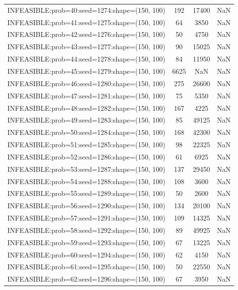 \begin{longtable}{lccc}
INFEASIBLE:prob=40:seed=1274:shape=(150, 100)  &   192 & 17400 &    NaN \\
INFEASIBLE:prob=41:seed=1275:shape=(150, 100)  &    64 &  3850 &    NaN \\
INFEASIBLE:prob=42:seed=1276:shape=(150, 100)  &    50 &  4750 &    NaN \\
INFEASIBLE:prob=43:seed=1277:shape=(150, 100)  &    90 & 15025 &    NaN \\
INFEASIBLE:prob=44:seed=1278:shape=(150, 100)  &    84 & 11950 &    NaN \\
INFEASIBLE:prob=45:seed=1279:shape=(150, 100)  &  6625 &   NaN &    NaN \\
INFEASIBLE:prob=46:seed=1280:shape=(150, 100)  &   275 & 26600 &    NaN \\
INFEASIBLE:prob=47:seed=1281:shape=(150, 100)  &    75 &  5350 &    NaN \\
INFEASIBLE:prob=48:seed=1282:shape=(150, 100)  &   167 &  4225 &    NaN \\
INFEASIBLE:prob=49:seed=1283:shape=(150, 100)  &    85 & 49125 &    NaN \\
INFEASIBLE:prob=50:seed=1284:shape=(150, 100)  &   168 & 42300 &    NaN \\
INFEASIBLE:prob=51:seed=1285:shape=(150, 100)  &    98 & 22325 &    NaN \\
INFEASIBLE:prob=52:seed=1286:shape=(150, 100)  &    61 &  6925 &    NaN \\
INFEASIBLE:prob=53:seed=1287:shape=(150, 100)  &   137 & 29450 &    NaN \\
INFEASIBLE:prob=54:seed=1288:shape=(150, 100)  &   108 &  3600 &    NaN \\
INFEASIBLE:prob=55:seed=1289:shape=(150, 100)  &    50 &  2600 &    NaN \\
INFEASIBLE:prob=56:seed=1290:shape=(150, 100)  &   134 & 20100 &    NaN \\
INFEASIBLE:prob=57:seed=1291:shape=(150, 100)  &   109 & 14325 &    NaN \\
INFEASIBLE:prob=58:seed=1292:shape=(150, 100)  &    89 & 49925 &    NaN \\
INFEASIBLE:prob=59:seed=1293:shape=(150, 100)  &    67 & 13225 &    NaN \\
INFEASIBLE:prob=60:seed=1294:shape=(150, 100)  &    62 &  4150 &    NaN \\
INFEASIBLE:prob=61:seed=1295:shape=(150, 100)  &    50 & 22550 &    NaN \\
INFEASIBLE:prob=62:seed=1296:shape=(150, 100)  &    67 &  3950 &    NaN \\

\end{longtable}

